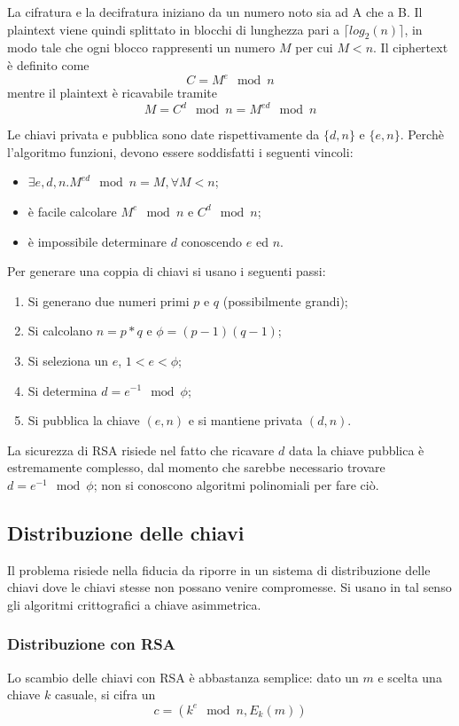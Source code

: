 \documentclass[a4paper, 10pt, twoside]{article}
\begin{document}
	La cifratura e la decifratura iniziano da un numero noto sia ad A che a B. Il plaintext viene quindi splittato in blocchi di lunghezza pari a $\lceil log_2(n) \rceil$, in modo tale che ogni blocco rappresenti un numero $M$ per cui $M < n$. Il ciphertext è definito come \[ C=M^e \mod n \] mentre il plaintext è ricavabile tramite \[ M = C^d \mod n = M^{ed} \mod n \]
	
	Le chiavi privata e pubblica sono date rispettivamente da $\lbrace d,n \rbrace$ e $\lbrace e,n \rbrace$. Perchè l'algoritmo funzioni, devono essere soddisfatti i seguenti vincoli:\begin{itemize}
		\item $\exists e,d,n. M^{ed} \mod n = M, \forall M<n$;
		\item è facile calcolare $M^e \mod n$ e $C^d \mod n$;
		\item è impossibile determinare $d$ conoscendo $e$ ed $n$.
	\end{itemize}
	
	Per generare una coppia di chiavi si usano i seguenti passi: \begin{enumerate}
		\item Si generano due numeri primi $p$ e $q$ (possibilmente grandi);
		\item Si calcolano $n=p*q$ e $\phi = (p-1)(q-1)$;
		\item Si seleziona un $e$, $1 < e < \phi$;
		\item Si determina $d = e^{-1} \mod \phi$;
		\item Si pubblica la chiave $(e,n)$ e si mantiene privata $(d,n)$. 
	\end{enumerate}

	La sicurezza di RSA risiede nel fatto che ricavare $d$ data la chiave pubblica è estremamente complesso, dal momento che sarebbe necessario trovare $d = e^{-1} \mod \phi$; non si conoscono algoritmi polinomiali per fare ciò.
	
	\subsection{Distribuzione delle chiavi}
	Il problema risiede nella fiducia da riporre in un sistema di distribuzione delle chiavi dove le chiavi stesse non possano venire compromesse. Si usano in tal senso gli algoritmi crittografici a chiave asimmetrica. 
	
	\subsubsection{Distribuzione con RSA}
	Lo scambio delle chiavi con RSA è abbastanza semplice: dato un $m$ e scelta una chiave $k$ casuale, si cifra un \[ c=(k^e \mod n, E_k(m)) \]
	
\end{document}
